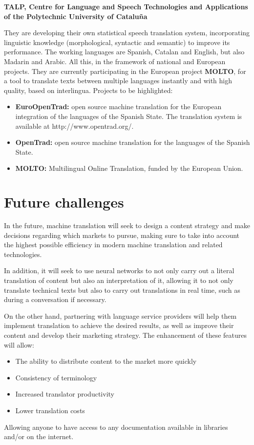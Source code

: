 \documentclass[a4paper]{article}
\theoremstyle{plain}
\theoremstyle{definition}
\begin{document}
    
   \begin{flushleft}
    \textbf{TALP, Centre for Language and Speech Technologies and Applications of the Polytechnic University of Cataluña}
   \end{flushleft}
    They are developing their own statistical speech translation system, incorporating linguistic knowledge (morphological, syntactic and semantic) to improve its performance. The working languages are Spanish, Catalan and English, but also Madarin and Arabic. All this, in the framework of national and European projects. They are currently participating in the European project \textbf{MOLTO}, for a tool to translate texts between multiple languages instantly and with high quality, based on interlingua. Projects to be highlighted:
    \begin{itemize}
        \item \textbf{EuroOpenTrad: }open source machine translation for the European integration of the languages of the Spanish State. The translation system is available at http://www.opentrad.org/.
        \item\textbf{OpenTrad: }open source machine translation for the languages of the Spanish State.
        \item \textbf{MOLTO: }Multilingual Online Translation, funded by the European Union.
    \end{itemize}

   
  



	\label{sec:examples}
	\section{Future challenges}
	\label{sec:examples}

	In the future, machine translation will seek to design a content strategy and make decisions regarding which markets to pursue, making sure to take into account the highest possible efficiency in modern machine translation and related technologies.\par

    In addition, it will seek to use neural networks to not only carry out a literal translation of content but also an interpretation of it, allowing it to not only translate technical texts but also to carry out translations in real time, such as during a conversation if necessary.\par

    On the other hand, partnering with language service providers will help them implement translation to achieve the desired results, as well as improve their content and develop their marketing strategy. The enhancement of these features will allow:
    \begin{itemize}
    \item The ability to distribute content to the market more quickly
    \item Consistency of terminology
    \item Increased translator productivity
    \item Lower translation costs
    \end{itemize}
    Allowing anyone to have access to any documentation available in libraries and/or on the internet.
\end{document}
